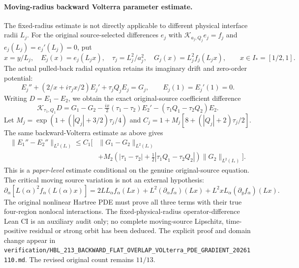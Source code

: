 \documentclass[11pt]{amsart}
\begin{document}
\paragraph{Moving-radius backward Volterra parameter estimate.}
The fixed-radius estimate is not directly applicable to different
physical interface radii \(L_j\). For the original source-selected
differences \(e_j\) with
\(\mathcal K_{a_j,Q_j}e_j=f_j\) and
\(e_j(L_j)=e_j'(L_j)=0\), put
\[
 x=y/L_j,\quad E_j(x)=e_j(L_jx),\quad
 \tau_j=L_j^2/a_j^2,\quad
 G_j(x)=L_j^2f_j(L_jx),\qquad x\in I_*=[1/2,1].
\]
The actual pulled-back radial equation retains its
imaginary drift and zero-order potential:
\[
 E_j''+(2/x+i\tau_jx/2)E_j'
         +\tau_jQ_jE_j=G_j,\qquad
 E_j(1)=E_j'(1)=0.
\]
Writing \(D=E_1-E_2\), we obtain the exact original-source
coefficient difference
\[
 \mathscr K_{\tau_1,Q_1}D
 =G_1-G_2-\tfrac{ix}{2}(\tau_1-\tau_2)E_2'
      -(\tau_1Q_1-\tau_2Q_2)E_2.
\]
Let \(M_j=\exp(1+(|Q_j|+3/2)\tau_j/4)\) and
\(C_j=1+M_j[8+(|Q_j|+2)\tau_j/2]\).
The same backward-Volterra estimate as above gives
\[
 \begin{aligned}
 \|E_1''-E_2''\|_{L^2(I_*)}\le C_1\bigg[
 &\|G_1-G_2\|_{L^2(I_*)}\\
 &+M_2\left(|\tau_1-\tau_2|
     +\tfrac12|\tau_1Q_1-\tau_2Q_2|\right)
     \|G_2\|_{L^2(I_*)}\bigg].
 \end{aligned}
\]
This is a \emph{paper-level} estimate conditional
on the genuine original-source equation. The critical
moving source variation is not an external hypothesis:
\[
 \partial_\alpha[L(\alpha)^2f_\alpha(L(\alpha)x)]
 =2LL_\alpha f_\alpha(Lx)
  +L^2(\partial_\alpha f_\alpha)(Lx)
  +L^2xL_\alpha(\partial_yf_\alpha)(Lx).
\]
The original nonlinear Hartree PDE must prove all three
terms with their true four-region nonlocal interactions.
The fixed-physical-radius operator-difference Lean CI
is an auxiliary audit only; no complete moving-source
Lipschitz, time-positive residual or strong orbit has
been deduced. The explicit proof and domain change
appear in
\texttt{verification/HBL\_213\_BACKWARD\_FLAT\_OVERLAP\_VOLterra\_PDE\_GRADIENT\_20261110.md}.
The revised original count remains \(11/13\).
\end{document}
